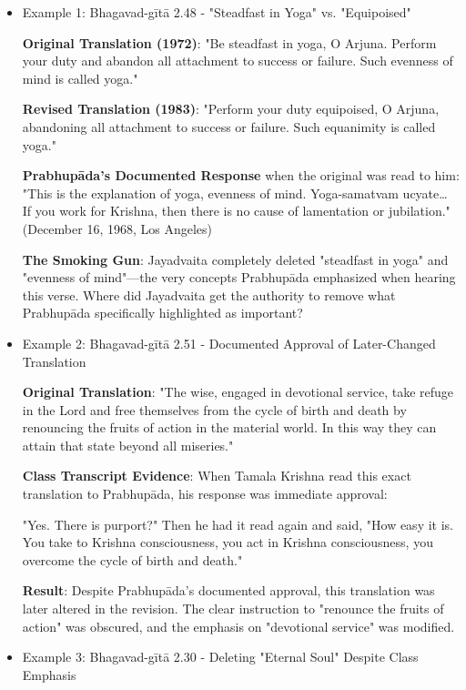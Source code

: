 \documentclass[11pt,twoside]{book}
\begin{document}
\begin{itemize}
\item Example 1: Bhagavad-gītā 2.48 - "Steadfast in Yoga" vs. "Equipoised"
\label{sec:orga01f043}

\textbf{\textbf{Original Translation (1972)}}: "Be steadfast in yoga, O Arjuna. Perform your duty and abandon all attachment to success or failure. Such evenness of mind is called yoga."

\textbf{\textbf{Revised Translation (1983)}}: "Perform your duty equipoised, O Arjuna, abandoning all attachment to success or failure. Such equanimity is called yoga."

\textbf{\textbf{Prabhupāda's Documented Response}} when the original was read to him:
"This is the explanation of yoga, evenness of mind. Yoga-samatvam ucyate\ldots{} If you work for Krishna, then there is no cause of lamentation or jubilation." (December 16, 1968, Los Angeles)

\textbf{\textbf{The Smoking Gun}}: Jayadvaita completely deleted "steadfast in yoga" and "evenness of mind"—the very concepts Prabhupāda emphasized when hearing this verse. Where did Jayadvaita get the authority to remove what Prabhupāda specifically highlighted as important?
\item Example 2: Bhagavad-gītā 2.51 - Documented Approval of Later-Changed Translation
\label{sec:org03095f0}

\textbf{\textbf{Original Translation}}: "The wise, engaged in devotional service, take refuge in the Lord and free themselves from the cycle of birth and death by renouncing the fruits of action in the material world. In this way they can attain that state beyond all miseries."

\textbf{\textbf{Class Transcript Evidence}}: When Tamala Krishna read this exact translation to Prabhupāda, his response was immediate approval:

"Yes. There is purport?" Then he had it read again and said, "How easy it is. You take to Krishna consciousness, you act in Krishna consciousness, you overcome the cycle of birth and death." 

\textbf{\textbf{Result}}: Despite Prabhupāda's documented approval, this translation was later altered in the revision. The clear instruction to "renounce the fruits of action" was obscured, and the emphasis on "devotional service" was modified.
\item Example 3: Bhagavad-gītā 2.30 - Deleting "Eternal Soul" Despite Class Emphasis
\label{sec:org8abaa3f}


\end{itemize}
\end{document}
